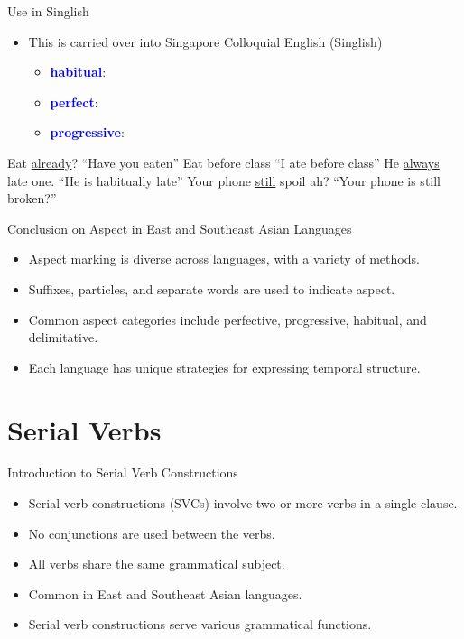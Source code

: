 \documentclass{beamer}
\newcommand{\txx}[1]{\textcolor{blue}{\textbf{#1}}}
\newcommand{\ul}[1]{\uline{#1}}
\begin{document}
\begin{frame}{Use in Singlish}
  \begin{itemize}
  \item This is carried over into Singapore Colloquial English (Singlish)
    \begin{itemize}
    \item \txx{habitual}: 
    \item \txx{perfect}: 
    \item \txx{progressive}: 
    \end{itemize}
  \end{itemize}
  \ex   Eat \ul{already}?  ``Have you eaten''
  \xe
  \ex  Eat before class ``I ate before class''
  \xe
  \ex  He \ul{always} late one. ``He is habitually late''
  \xe
   \ex  Your phone \ul{still} spoil ah? ``Your phone is still broken?'' 
   \xe
\end{frame}


\begin{frame}{Conclusion on Aspect in East and Southeast Asian Languages}
\begin{itemize}
    \item Aspect marking is diverse across languages, with a variety of methods.
    \item Suffixes, particles, and separate words are used to indicate aspect.
    \item Common aspect categories include perfective, progressive, habitual, and delimitative.
    \item Each language has unique strategies for expressing temporal structure.
\end{itemize}
\end{frame}

\section{Serial Verbs}

\begin{frame}{Introduction to Serial Verb Constructions}
\begin{itemize}
    \item Serial verb constructions (SVCs) involve two or more verbs in a single clause.
    \item No conjunctions are used between the verbs.
    \item All verbs share the same grammatical subject.
    \item Common in East and Southeast Asian languages.
    \item Serial verb constructions serve various grammatical functions.
\end{itemize}
\end{frame}
\end{document}
